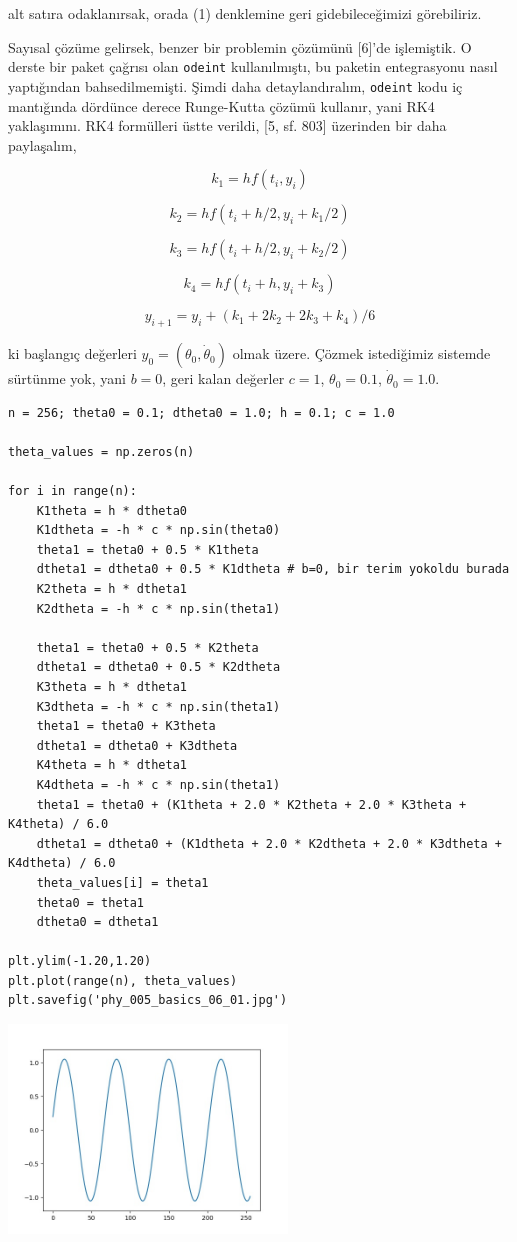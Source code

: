 \documentclass[12pt,fleqn]{article}\usepackage{../../common}
\begin{document}
alt satıra odaklanırsak, orada (1) denklemine geri gidebileceğimizi görebiliriz.

Sayısal çözüme gelirsek, benzer bir problemin çözümünü [6]'de işlemiştik.  O
derste bir paket çağrısı olan \verb!odeint! kullanılmıştı, bu paketin
entegrasyonu nasıl yaptığından bahsedilmemişti. Şimdi daha detaylandıralım,
\verb!odeint! kodu iç mantığında dördünce derece Runge-Kutta çözümü kullanır,
yani RK4 yaklaşımını. RK4 formülleri üstte verildi, [5, sf. 803] üzerinden
bir daha paylaşalım,

$$
k_1 = h f(t_i, y_i)
$$

$$
k_2 = h f(t_i + h/2, y_i + k_1/2)
$$

$$
k_3 = h f(t_i + h/2, y_i + k_2/2)
$$

$$
k_4 = h f(t_i + h, y_i + k_3)
$$

$$
y_{i+1} = y_i + (k_1 + 2 k_2 + 2 k_3 + k_4) / 6
$$

ki başlangıç değerleri $y_0 = (\theta_0,\dot{\theta}_0)$ olmak üzere. Çözmek
istediğimiz sistemde sürtünme yok, yani $b=0$, geri kalan değerler $c=1$,
$\theta_0=0.1$, $\dot{\theta}_0 = 1.0$.


\begin{verbatim}
n = 256; theta0 = 0.1; dtheta0 = 1.0; h = 0.1; c = 1.0

theta_values = np.zeros(n)

for i in range(n):
    K1theta = h * dtheta0
    K1dtheta = -h * c * np.sin(theta0)
    theta1 = theta0 + 0.5 * K1theta
    dtheta1 = dtheta0 + 0.5 * K1dtheta # b=0, bir terim yokoldu burada
    K2theta = h * dtheta1
    K2dtheta = -h * c * np.sin(theta1)

    theta1 = theta0 + 0.5 * K2theta
    dtheta1 = dtheta0 + 0.5 * K2dtheta
    K3theta = h * dtheta1
    K3dtheta = -h * c * np.sin(theta1)
    theta1 = theta0 + K3theta
    dtheta1 = dtheta0 + K3dtheta
    K4theta = h * dtheta1
    K4dtheta = -h * c * np.sin(theta1)
    theta1 = theta0 + (K1theta + 2.0 * K2theta + 2.0 * K3theta + K4theta) / 6.0
    dtheta1 = dtheta0 + (K1dtheta + 2.0 * K2dtheta + 2.0 * K3dtheta + K4dtheta) / 6.0
    theta_values[i] = theta1
    theta0 = theta1
    dtheta0 = dtheta1

plt.ylim(-1.20,1.20)
plt.plot(range(n), theta_values)
plt.savefig('phy_005_basics_06_01.jpg')
\end{verbatim}

\includegraphics[width=20em]{phy_005_basics_06_01.jpg}
\end{document}
